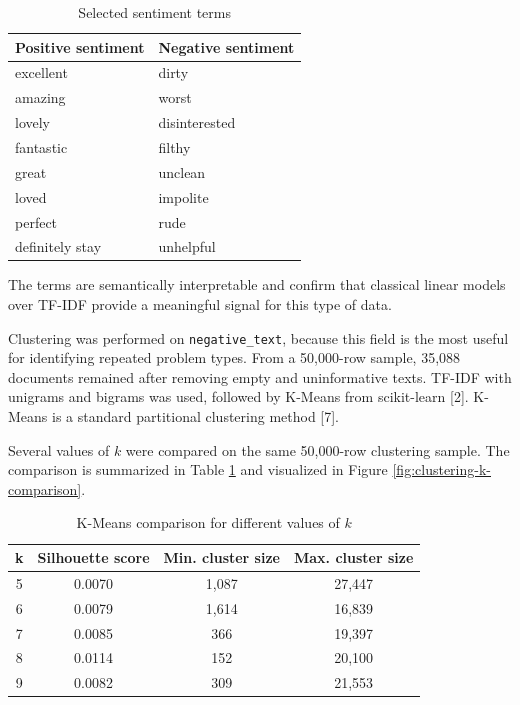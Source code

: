 \documentclass[twoside, 12pt]{article}
\begin{document}
\begin{table}[H]
\centering
\caption{Selected sentiment terms}
\begin{tabular}{|p{5.8cm}|p{5.8cm}|}
\hline
\textbf{Positive sentiment} & \textbf{Negative sentiment} \\ \hline
excellent & dirty \\ \hline
amazing & worst \\ \hline
lovely & disinterested \\ \hline
fantastic & filthy \\ \hline
great & unclean \\ \hline
loved & impolite \\ \hline
perfect & rude \\ \hline
definitely stay & unhelpful \\ \hline
\end{tabular}
\end{table}

The terms are semantically interpretable and confirm that classical linear models over TF-IDF provide a meaningful signal for this type of data.



Clustering was performed on \texttt{negative\_text}, because this field is the most useful for identifying repeated problem types. From a 50,000-row sample, 35,088 documents remained after removing empty and uninformative texts. TF-IDF with unigrams and bigrams was used, followed by K-Means from scikit-learn [2]. K-Means is a standard partitional clustering method [7].


Several values of $k$ were compared on the same 50,000-row clustering sample. The comparison is summarized in Table \ref{tab:clustering-k-comparison} and visualized in Figure \ref{fig:clustering-k-comparison}.

\begin{table}[H]
\centering
\caption{K-Means comparison for different values of $k$}
\label{tab:clustering-k-comparison}
\begin{tabular}{|c|c|c|c|}
\hline
\textbf{k} & \textbf{Silhouette score} & \textbf{Min. cluster size} & \textbf{Max. cluster size} \\ \hline
5 & 0.0070 & 1,087 & 27,447 \\ \hline
6 & 0.0079 & 1,614 & 16,839 \\ \hline
7 & 0.0085 & 366 & 19,397 \\ \hline
8 & 0.0114 & 152 & 20,100 \\ \hline
9 & 0.0082 & 309 & 21,553 \\ \hline
\end{tabular}
\end{table}
\end{document}
